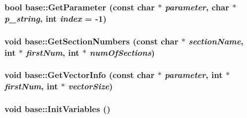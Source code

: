 \label{classbase_a2643c255e2ae69b02c1ef7a427743453}
\hypertarget{classbase_aff0b96b92d78c345fd60335cece99d08}{
\subsubsection[{GetParameter}]{\setlength{\rightskip}{0pt plus 5cm}bool base::GetParameter (const char $\ast$ {\em parameter}, \/  char $\ast$ {\em p\_\-string}, \/  int {\em index} = {\ttfamily -\/1})}}
\label{classbase_aff0b96b92d78c345fd60335cece99d08}
\hypertarget{classbase_a4f63fec241f5857f3fe28b43f85d0fa5}{
\subsubsection[{GetSectionNumbers}]{\setlength{\rightskip}{0pt plus 5cm}void base::GetSectionNumbers (const char $\ast$ {\em sectionName}, \/  int $\ast$ {\em firstNum}, \/  int $\ast$ {\em numOfSections})}}
\label{classbase_a4f63fec241f5857f3fe28b43f85d0fa5}
\hypertarget{classbase_ad413a7174fe9559a9b6f23f39d286c5c}{
\subsubsection[{GetVectorInfo}]{\setlength{\rightskip}{0pt plus 5cm}void base::GetVectorInfo (const char $\ast$ {\em parameter}, \/  int $\ast$ {\em firstNum}, \/  int $\ast$ {\em vectorSize})}}
\label{classbase_ad413a7174fe9559a9b6f23f39d286c5c}
\hypertarget{classbase_ad2f5f5c9ec517641f63e52646cf49ad9}{
\subsubsection[{InitVariables}]{\setlength{\rightskip}{0pt plus 5cm}void base::InitVariables ()}}
\label{classbase_ad2f5f5c9ec517641f63e52646cf49ad9}


